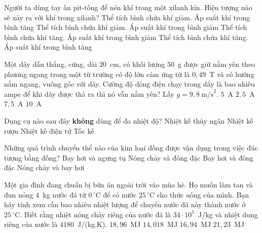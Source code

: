 	\begin{ex}%
		Người ta dùng tay ấn pit-tông để nén khí trong một xilanh kín. Hiện tượng nào sẽ xảy ra với khí trong xilanh?
		\choice
		{\True Thể tích bình chứa khí giảm. Áp suất khí trong bình tăng}
		{Thể tích bình chứa khí giảm. Áp suất khí trong bình giảm}
		{Thể tích bình chứa khí tăng. Áp suất khí trong bình giảm}
		{Thể tích bình chứa khí tăng. Áp suất khí trong bình tăng}
	\end{ex}

	\begin{ex}%
		Một dây dẫn thẳng, cứng, dài $20$~cm, có khối lượng $50$~g được giữ nằm yên theo phương ngang trong một từ trường có độ lớn cảm ứng từ là $0{,}49$~T và có hướng nằm ngang, vuông góc với dây. Cường độ dòng điện chạy trong dây là bao nhiêu ampe để khi dây được thả ra thì nó vẫn nằm yên? Lấy $g=9{,}8~\text{m/s}^2$.
		\choice
		{\True $5$~A}
		{$2{,}5$~A}
		{$7{,}5$~A}
		{$10$~A}
	\end{ex}

	\begin{ex}%
		Dụng cụ nào sau đây \textbf{không} dùng để đo nhiệt độ?
		\choice
		{Nhiệt kế thủy ngân}
		{Nhiệt kế rượu}
		{Nhiệt kế điện tử}
		{\True Tốc kế}
	\end{ex}

	\begin{ex}%
		Những quá trình chuyển thể nào của kim loại đồng được vận dụng trong việc đúc tượng bằng đồng?
		\choice
		{Bay hơi và ngưng tụ}
		{\True Nóng chảy và đông đặc}
		{Bay hơi và đông đặc}
		{Nóng chảy và bay hơi}
	\end{ex}

	\begin{ex}%
		Một gia đình đang chuẩn bị bữa ăn ngoài trời vào mùa hè. Họ muốn làm tan và đun nóng $4$~kg nước đá từ $0\,^\circ\text{C}$ để có nước $25\,^\circ\text{C}$ cho thức uống của mình. Bạn hãy tính xem cần bao nhiêu nhiệt lượng để chuyển nước đá này thành nước ở $25\,^\circ\text{C}$. Biết rằng nhiệt nóng chảy riêng của nước đá là $34\cdot 10^5$~J/kg và nhiệt dung riêng của nước là $4180$~J/(kg.K).
		\choice
		{$18{,}96$~MJ}
		{\True $14{,}018$~MJ}
		{$16{,}94$~MJ}
		{$21{,}23$~MJ}
	\end{ex}

